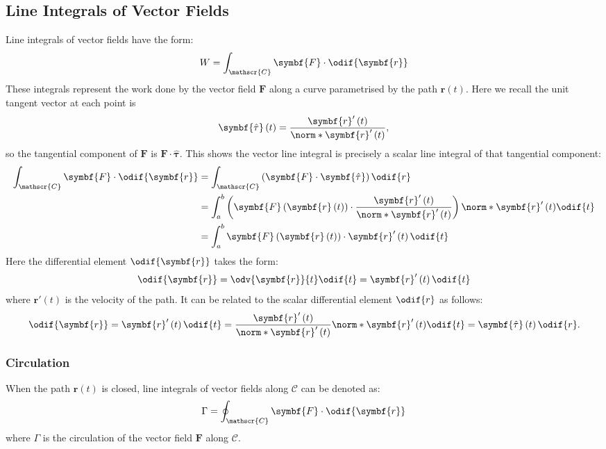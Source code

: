 \documentclass{article}
\begin{document}
\subsection{Line Integrals of Vector Fields}
Line integrals of vector fields have the form:
\begin{equation*}
    W = \int_{\mathscr{C}} \symbf{F} \cdot \odif{\symbf{r}}
\end{equation*}
These integrals represent the work done by the vector field \(\symbf{F}\)
along a curve parametrised by the path \(\symbf{r}\left( t \right)\).
Here we recall the unit tangent vector at each point is
\begin{equation*}
    \symbf{\hat{\tau}}\left( t \right) = \frac{\symbf{r}'\left( t \right)}{\norm*{\symbf{r}'\left( t \right)}},
\end{equation*}
so the tangential component of \(\symbf{F}\) is \(\symbf{F} \cdot \symbf{\hat{\tau}}\).
This shows the vector line integral is precisely a scalar line integral of
that tangential component:
\begin{align*}
    \int_{\mathscr{C}} \symbf{F} \cdot \odif{\symbf{r}}
     & = \int_{\mathscr{C}} \left( \symbf{F} \cdot \symbf{\hat{\tau}} \right) \odif{r}                                                                                                                     \\
     & = \int_a^b \left( \symbf{F}\left( \symbf{r}\left( t \right) \right) \cdot \frac{\symbf{r}'\left( t \right)}{\norm*{\symbf{r}'\left( t \right)}} \right) \norm*{\symbf{r}'\left( t \right)} \odif{t} \\
     & = \int_a^b \symbf{F}\left( \symbf{r}\left( t \right) \right) \cdot \symbf{r}'\left( t \right) \odif{t}
\end{align*}
Here the differential element \(\odif{\symbf{r}}\) takes the form:
\begin{equation*}
    \odif{\symbf{r}} = \odv{\symbf{r}}{t} \odif{t} = \symbf{r}'\left( t \right) \odif{t}
\end{equation*}
where \(\symbf{r}'\left( t \right)\) is the velocity of the path. It can
be related to the scalar differential element \(\odif{r}\) as follows:
\begin{equation*}
    \odif{\symbf{r}} = \symbf{r}'\left( t \right) \odif{t} = \frac{\symbf{r}'\left( t \right)}{\norm*{\symbf{r}'\left( t \right)}} \norm*{\symbf{r}'\left( t \right)} \odif{t} = \symbf{\hat{\tau}}\left( t \right) \odif{r}.
\end{equation*}
\subsubsection{Circulation}
When the path \(\symbf{r}\left( t \right)\) is closed, line integrals
of vector fields along \(\mathscr{C}\) can be denoted as:
\begin{equation*}
    \Gamma = \oint_{\mathscr{C}} \symbf{F} \cdot \odif{\symbf{r}}
\end{equation*}
where \(\Gamma\) is the circulation of the vector field \(\symbf{F}\)
along \(\mathscr{C}\).
\end{document}
